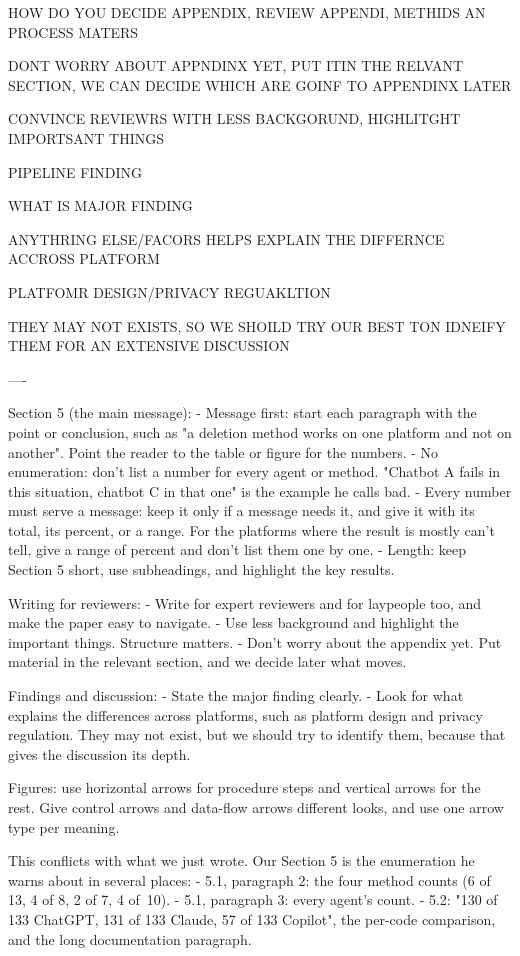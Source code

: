 HOW DO YOU DECIDE APPENDIX, REVIEW APPENDI, METHIDS AN PROCESS MATERS

DONT WORRY ABOUT APPNDINX YET, PUT ITIN THE RELVANT SECTION, WE CAN DECIDE WHICH ARE GOINF TO  APPENDINX LATER


CONVINCE REVIEWRS WITH LESS BACKGORUND, HIGHLITGHT IMPORTSANT THINGS

PIPELINE 
FINDING


WHAT IS MAJOR FINDING

ANYTHRING ELSE/FACORS HELPS EXPLAIN THE DIFFERNCE ACCROSS PLATFORM

PLATFOMR DESIGN/PRIVACY REGUAKLTION

THEY MAY NOT EXISTS, SO WE SHOILD TRY OUR BEST TON IDNEIFY THEM FOR AN EXTENSIVE DISCUSSION

----

Section 5 (the main message):
- Message first: start each paragraph with the point or conclusion, such as "a deletion method works on one platform and not on another". Point the reader to the table or figure for the numbers.
- No enumeration: don't list a number for every agent or method. "Chatbot A fails in this situation, chatbot C in that one" is the example he calls bad.
- Every number must serve a message: keep it only if a message needs it, and give it with its total, its percent, or a range. For the platforms where the result is mostly can't tell, give a range of percent and don't list them one by one.
- Length: keep Section 5 short, use subheadings, and highlight the key results.

Writing for reviewers:
- Write for expert reviewers and for laypeople too, and make the paper easy to navigate.
- Use less background and highlight the important things. Structure matters.
- Don't worry about the appendix yet. Put material in the relevant section, and we decide later what moves.

Findings and discussion:
- State the major finding clearly.
- Look for what explains the differences across platforms, such as platform design and privacy regulation. They may not exist, but we should try to identify them, because that gives the discussion its depth.

Figures: use horizontal arrows for procedure steps and vertical arrows for the rest. Give control arrows and data-flow arrows different looks, and use one arrow type per meaning.

This conflicts with what we just wrote. Our Section 5 is the enumeration he warns about in several places:
- 5.1, paragraph 2: the four method counts (6 of 13, 4 of 8, 2 of 7, 4 of 10).
- 5.1, paragraph 3: every agent's count.
- 5.2: "130 of 133 ChatGPT, 131 of 133 Claude, 57 of 133 Copilot", the per-code comparison, and the long documentation paragraph.

